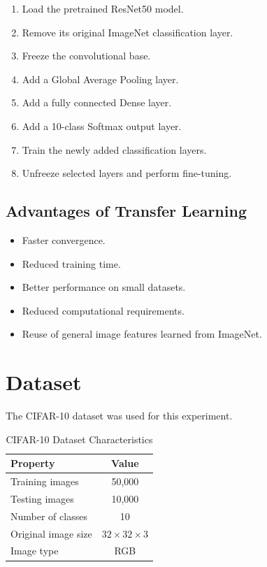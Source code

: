 \documentclass[12pt,a4paper]{article}
\begin{document}
\begin{enumerate}
    \item Load the pretrained ResNet50 model.
    \item Remove its original ImageNet classification layer.
    \item Freeze the convolutional base.
    \item Add a Global Average Pooling layer.
    \item Add a fully connected Dense layer.
    \item Add a 10-class Softmax output layer.
    \item Train the newly added classification layers.
    \item Unfreeze selected layers and perform fine-tuning.
\end{enumerate}

\subsection{Advantages of Transfer Learning}

\begin{itemize}
    \item Faster convergence.
    \item Reduced training time.
    \item Better performance on small datasets.
    \item Reduced computational requirements.
    \item Reuse of general image features learned from ImageNet.
\end{itemize}


\section{Dataset}

The CIFAR-10 dataset was used for this experiment.

\begin{table}[H]
\centering
\caption{CIFAR-10 Dataset Characteristics}
\begin{tabular}{lc}
\toprule
\textbf{Property} & \textbf{Value} \\
\midrule
Training images & 50,000 \\
Testing images & 10,000 \\
Number of classes & 10 \\
Original image size & $32\times32\times3$ \\
Image type & RGB \\
\bottomrule
\end{tabular}
\end{table}
\end{document}
